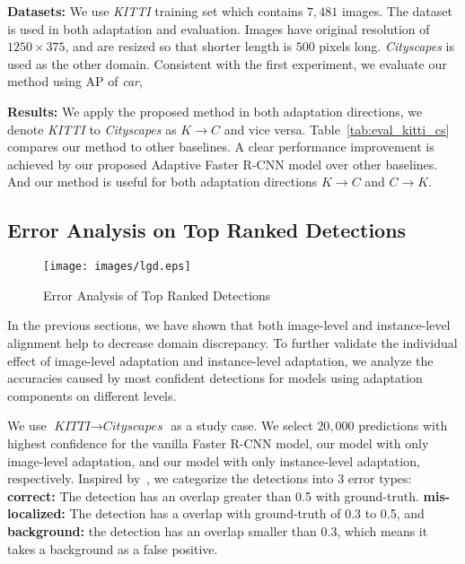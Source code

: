 \documentclass[10pt,twocolumn,letterpaper]{article}
\def\cs{\textit{Cityscapes} }
\def\kitti{\textit{KITTI} }
\begin{document}
\textbf{Datasets:} We use \kitti training set which contains $7,481$ images. The dataset is used in both adaptation and evaluation. Images have original resolution of $1250 \times 375$, and are resized so that shorter length is $500$ pixels long. \cs is used as the other domain. Consistent with the first experiment, we evaluate our method using AP of \textit{car}, 

\textbf{Results:} We apply the proposed method in both adaptation directions, we denote \kitti to \cs as $K \rightarrow C$ and vice versa. Table~\ref{tab:eval_kitti_cs} compares our method to other baselines. A clear performance improvement is achieved by our proposed Adaptive Faster R-CNN model over other baselines. And our method is useful for both adaptation directions $K \rightarrow C$ and $C \rightarrow K$. 


\subsection{Error Analysis on Top Ranked Detections}
\begin{figure}
\centering
      \texttt{[image: images/lgd.eps]}
      \\
\hspace{1mm}
\caption{Error Analysis of Top Ranked Detections}
\label{fig:error_ana}
\vspace{-2mm}
\end{figure}

In the previous sections, we have shown that both image-level and instance-level alignment help to decrease domain discrepancy. To further validate the individual effect of image-level adaptation and instance-level adaptation, we analyze the accuracies caused by most confident detections for models using adaptation components on different levels. 

We use $\kitti \rightarrow \cs$ as a study case. We select $20,000$ predictions with highest confidence for the vanilla Faster R-CNN model, our model with only image-level adaptation, and our model with only instance-level adaptation, respectively.  Inspired by~\cite{hoiem2012diagnosing}, we categorize the detections into 3 error types: \textbf{correct:} The detection has an overlap greater than 0.5 with ground-truth. \textbf{mis-localized:} The detection has a overlap with ground-truth of 0.3 to 0.5, and \textbf{background:} the detection has an overlap smaller than 0.3, which means it takes a background as a false positive. 
\end{document}

